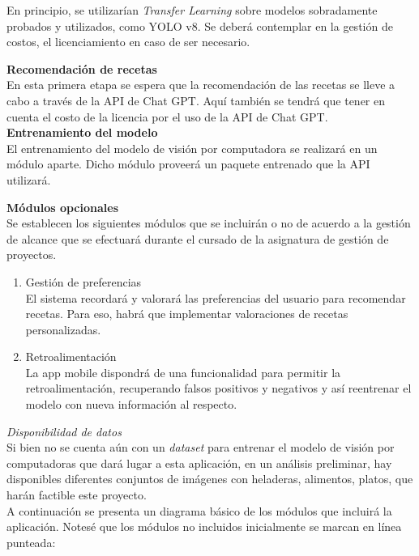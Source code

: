 \documentclass[
11pt, %
]{charter}
\begin{document}
En principio, se utilizarían \textit{Transfer Learning} sobre modelos sobradamente probados y utilizados, como YOLO v8. Se deberá contemplar en la gestión de costos, el licenciamiento en caso de ser necesario.

\textbf{Recomendación de recetas}\\
En esta primera etapa se espera que la recomendación de las recetas se lleve a cabo a través de la API de Chat GPT. Aquí también se tendrá que tener en cuenta el costo de la licencia por el uso de la API de Chat GPT. \\

\textbf{Entrenamiento del modelo}\\
El entrenamiento del modelo de visión por computadora se realizará en un módulo aparte. Dicho módulo proveerá un paquete entrenado que la API utilizará.

\textbf{Módulos opcionales}\\
Se establecen los siguientes módulos que se incluirán o no de acuerdo a la gestión de alcance que se efectuará durante el cursado de la asignatura de gestión de proyectos.
\begin{enumerate}
\item Gestión de preferencias\\
El sistema recordará y valorará las preferencias del usuario para recomendar recetas. Para eso, habrá que implementar valoraciones de recetas personalizadas.

\item Retroalimentación \\
La app mobile dispondrá de una funcionalidad para permitir la retroalimentación, recuperando falsos positivos y negativos y así reentrenar el modelo con nueva información al respecto. 
\end{enumerate}

\textit{Disponibilidad de datos}\\
Si bien no se cuenta aún con un \textit{dataset} para entrenar el modelo de visión por computadoras que dará lugar a esta aplicación, en un análisis preliminar, hay disponibles diferentes conjuntos de imágenes con heladeras, alimentos, platos, que harán factible este proyecto. \\

A continuación se presenta un diagrama básico de los módulos que incluirá la aplicación. Notesé que los módulos no incluidos inicialmente se marcan en línea punteada:
\label{sec:DiagramaGeneral}
\end{document}
